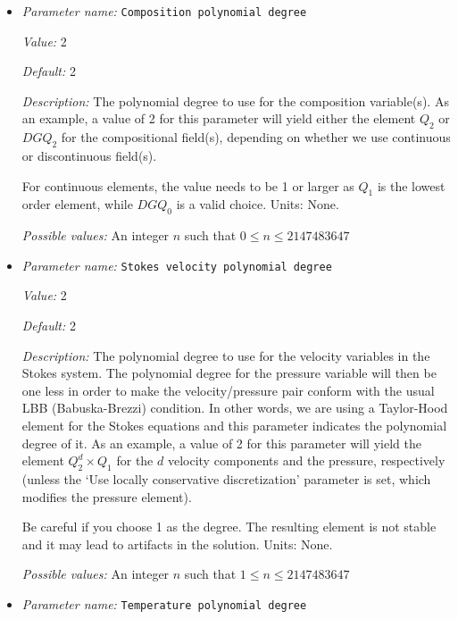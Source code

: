 \begin{itemize}
\item {\it Parameter name:} {\tt Composition polynomial degree}
\label{parameters:Discretization/Composition polynomial degree}
\label{parameters:Discretization/Composition_20polynomial_20degree}


{\it Value:} 2


{\it Default:} 2


{\it Description:} The polynomial degree to use for the composition variable(s). As an example, a value of 2 for this parameter will yield either the element $Q_2$ or $DGQ_2$ for the compositional field(s), depending on whether we use continuous or discontinuous field(s). 

For continuous elements, the value needs to be 1 or larger as $Q_1$ is the lowest order element, while $DGQ_0$ is a valid choice. Units: None.


{\it Possible values:} An integer $n$ such that $0\leq n \leq 2147483647$
\item {\it Parameter name:} {\tt Stokes velocity polynomial degree}
\label{parameters:Discretization/Stokes velocity polynomial degree}
\label{parameters:Discretization/Stokes_20velocity_20polynomial_20degree}


{\it Value:} 2


{\it Default:} 2


{\it Description:} The polynomial degree to use for the velocity variables in the Stokes system. The polynomial degree for the pressure variable will then be one less in order to make the velocity/pressure pair conform with the usual LBB (Babuska-Brezzi) condition. In other words, we are using a Taylor-Hood element for the Stokes equations and this parameter indicates the polynomial degree of it. As an example, a value of 2 for this parameter will yield the element $Q_2^d \times Q_1$ for the $d$ velocity components and the pressure, respectively (unless the `Use locally conservative discretization' parameter is set, which modifies the pressure element). 

Be careful if you choose 1 as the degree. The resulting element is not stable and it may lead to artifacts in the solution. Units: None.


{\it Possible values:} An integer $n$ such that $1\leq n \leq 2147483647$
\item {\it Parameter name:} {\tt Temperature polynomial degree}
\label{parameters:Discretization/Temperature polynomial degree}
\label{parameters:Discretization/Temperature_20polynomial_20degree}



\end{itemize}
